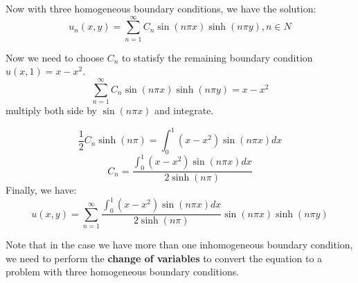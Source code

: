 \documentclass[12pt]{article} %
\begin{document}
Now with three homogeneous boundary conditions, we have the solution:
$$
u_{n}(x, y) = \sum_{n = 1}^{\infty} C_{n}\sin(n\pi x)\sinh(n\pi y), n \in N
$$\par
Now we need  to choose $C_{n}$ to statisfy the remaining boundary condition $u(x, 1) = x-x^{2}$.
$$
 \sum_{n = 1}^{\infty} C_{n}\sin(n\pi x)\sinh(n\pi y) = x-x^{2}
$$multiply both side by $\sin(n\pi x)$ and integrate.\par
$$
\frac{1}{2}C_{n}\sinh(n\pi) = \int_{0}^{1}(x-x^{2})\sin(n\pi x)dx
$$
$$
C_{n}=\frac{ \int_{0}^{1}(x-x^{2})\sin(n\pi x)dx}{2\sinh(n\pi) }
$$
 Finally, we have:
 $$
 u(x, y)=\sum_{n=1}^{\infty}\frac{ \int_{0}^{1}(x-x^{2})\sin(n\pi x)dx}{2\sinh(n\pi) }\sin(n\pi x)\sinh(n\pi y) 
 $$\par
 Note that in the case we have more than one inhomogeneous boundary condition, we need to perform the \textbf{change of variables} to convert the equation to a problem with three homogeneous boundary conditions.\par
\end{document}
